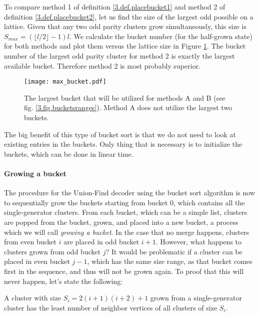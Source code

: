 To compare method 1 of definition \ref{3.def.placebucket1} and method 2 of definition \ref{3.def.placebucket2}, let us find the size of the largest odd possible on a lattice. Given that any two odd parity clusters grow simultaneously, this size is $S_{max} = (\lfloor l/2\rfloor-1)l$. We calculate the bucket number (for the half-grown state) for both methods and plot them versus the lattice size in Figure \ref{3.fig.maxbucket}. The bucket number of the largest odd parity cluster for method 2 is exactly the largest available bucket. Therefore method 2 is most probably superior.

\begin{figure}[htpb]
  \centering
  \texttt{[image: max\_bucket.pdf]}
  \caption{The largest bucket that will be utilized for methods A and B (see fig. \ref{3.fig.bucketsranges}). Method A does not utilize the largest two buckets. }\label{3.fig.maxbucket}
\end{figure}

The big benefit of this type of bucket sort is that we do not need to look at existing entries in the buckets. Only thing that is necessary is to initialize the buckets, which can be done in linear time.

\paragraph{Growing a bucket}

The procedure for the Union-Find decoder using the bucket sort algorithm is now to sequentially grow the buckets starting from bucket 0, which contains all the single-generator clusters. From each bucket, which can be a simple list, clusters are popped from the bucket, grown, and placed into a new bucket, a process which we will call \emph{growing a bucket}. In the case that no merge happens, clusters from even bucket $i$ are placed in odd bucket $i+1$. However, what happens to clusters grown from odd bucket $j$? It would be problematic if a cluster can be placed in even bucket $j-1$, which has the same size range, as that bucket comes first in the sequence, and thus will not be grown again. To proof that this will never happen, let's state the following:

\begin{lemma}
  A cluster with size $S_i = 2(i+1)(i+2) + 1$ grown from a single-generator cluster has the least number of neighbor vertices of all clusters of size $S_i$.
\end{lemma}


